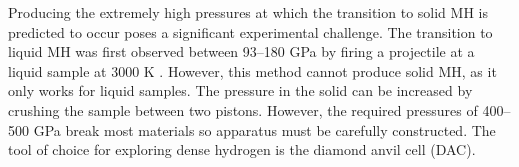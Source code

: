 \documentclass[esp]{FCEFyN-class}
\begin{document}

Producing the extremely high pressures at which the transition to solid MH is predicted to occur poses a significant experimental challenge. The transition to liquid MH was first observed between 93--180 GPa by firing a projectile at a liquid sample at 3000 K \cite{weir1996}. However, this method cannot produce solid MH, as it only works for liquid samples. The pressure in the solid can be increased by crushing the sample between two pistons. However, the required pressures of 400--500 GPa break most materials so apparatus must be carefully constructed. The tool of choice for exploring dense hydrogen is the diamond anvil cell (DAC).



\end{document}
